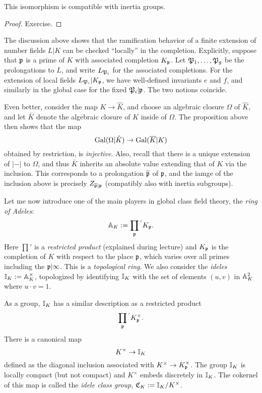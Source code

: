 \begin{proposition}
  This isomorphism is compatible with inertia groups.
\end{proposition}
\begin{proof}
  Exercise.
\end{proof}

The discussion above shows that the ramification behavior of a finite extension of number fields $L|K$ can be checked ``locally'' in the completion.
Explicitly, suppose that $\mathfrak{p}$ is a prime of $K$ with associated completion $K_{\mathfrak{p}}$.
Let $\mathfrak{P}_{1},\ldots,\mathfrak{P}_{g}$ be the prolongations to $L$, and write $L_{\mathfrak{P}_{i}}$ for the associated completions.
For the extension of local fields $L_{\mathfrak{P}_{i}}|K_{\mathfrak{p}}$, we have well-defined invariants $e$ and $f$, and similarly in the global case for the fixed $\mathfrak{P}_{i}|\mathfrak{p}$.
The two notions coincide.

Even better, consider the map $K \to \hat K$, and choose an algebraic closure $\Omega$ of $\hat K$, and let $\bar K$ denote the algebraic closure of $K$ inside of $\Omega$.
The proposition above then shows that the map
\[ \operatorname{Gal}(\Omega|\hat K) \to \operatorname{Gal}(\overline K|K) \]
obtained by restriction, is \emph{injective}.
Also, recall that there is a unique extension of $|-|$ to $\Omega$, and thus $\bar K$ inherits an absolute value extending that of $K$ via the inclusion.
This corresponds to a prolongation $\overline {\mathfrak{p}}$ of $\mathfrak{p}$, and the iamge of the inclusion above is precisely $Z_{\overline{\mathfrak{p}}|\mathfrak{p}}$ (compatibly also with inertia subgroups).

Let me now introduce one of the main players in global class field theory, the \emph{ring of Adeles}:
\[ \mathbb{A}_{K} := \prod_{\mathfrak{p}}{}^{'} K_{\mathfrak{p}}. \]
Here $\prod'$ is a \emph{restricted product} (explained during lecture) and $K_{\mathfrak{p}}$ is the completion of $K$ with respect to the place $\mathfrak{p}$, which varies over all primes including the $\mathfrak{p}|\infty$.
This is a \emph{topological ring}.
We also consider the \emph{ideles} $\mathbb{I}_{K} := \mathbb{A}_{K}^{\times}$, topologized by identifying $\mathbb{I}_{K}$ with the set of elements $(u,v)$ in $\mathbb{A}_{K}^{2}$ where $u \cdot v = 1$.

As a group, $\mathbb{I}_{K}$ has a similar description as a restricted product
\[ \prod_{\mathfrak{p}} {}^{'} K_{\mathfrak{p}}^{\times}. \]
There is a canonical map
\[ K^{\times} \to \mathbb{I}_{K} \]
defined as the diagonal inclusion associated with $K^{\times} \to K_{\mathfrak{p}}^{\times}$.
The group $\mathbb{I}_{K}$ is locally compact (but not compact) and $K^{\times}$ embeds discretely in $\mathbb{I}_{K}$.
The cokernel of this map is called the \emph{idele class group}, $\mathfrak{C}_{K} := \mathbb{I}_{K}/K^{\times}$.

